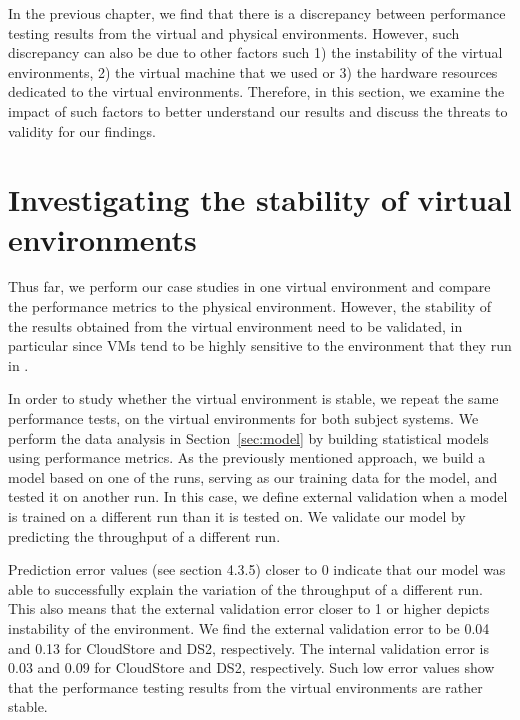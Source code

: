 In the previous chapter, we find that there is a discrepancy between performance testing results from the virtual and physical environments. However, such discrepancy can also be due to other factors such 1) the instability of the virtual environments, 2) the virtual machine that we used or 3) the hardware resources dedicated to the virtual environments. Therefore, in this section, we examine the impact of such factors to better understand our results and discuss the threats to validity for our findings. 


\section{Investigating the stability of virtual environments}

Thus far, we perform our case studies in one virtual environment and compare the performance metrics to the physical environment. However, the stability of the results obtained from the virtual environment need to be validated, in particular since VMs tend to be highly sensitive to the environment that they run in \cite{leitner}.


In order to study whether the virtual environment is stable, we repeat the same performance tests, on the virtual environments for both subject systems. We perform the data analysis in Section~\ref{sec:model} by building statistical models using performance metrics. %
As the previously mentioned approach, we build a model based on one of the runs, serving as our training data for the model, and tested it on another run. In this case, we define external validation when a model is trained on a different run than it is tested on. We validate our model by predicting the throughput of a different run.  

Prediction error values (see section 4.3.5) closer to 0 indicate that our model was able to successfully explain the variation of the throughput of a different run. This also means that the external validation error closer to 1 or higher depicts instability of the environment. We find the external validation error to be 0.04 and 0.13 for CloudStore and DS2, respectively. The internal validation error is 0.03 and 0.09 for CloudStore and DS2, respectively. Such low error values show that the performance testing results from the virtual environments are rather stable. 

